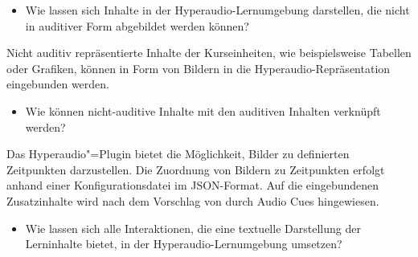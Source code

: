 \begin{itemize}
\item Wie lassen sich Inhalte in der Hyperaudio-Lernumgebung darstellen, die nicht in auditiver Form abgebildet werden können?
\end{itemize}

\hfill\begin{minipage}{\textwidth-1cm}
\vspace{0.1cm}
Nicht auditiv repräsentierte Inhalte der Kurseinheiten, wie beispielsweise Tabellen oder Grafiken, können in Form von Bildern in die Hyperaudio-Repräsentation eingebunden werden.
\vspace{0.25cm}
\end{minipage}

\begin{itemize}
\item Wie können nicht-auditive Inhalte mit den auditiven Inhalten verknüpft werden?
\end{itemize}

\hfill\begin{minipage}{\textwidth-1cm}
\vspace{0.1cm}
Das Hyperaudio"=Plugin bietet die Möglichkeit, Bilder zu definierten Zeitpunkten darzustellen. Die Zuordnung von Bildern zu Zeitpunkten erfolgt anhand einer Konfigurationsdatei im JSON-Format. Auf die eingebundenen Zusatzinhalte wird nach dem Vorschlag von \cite{donker2007gestaltung} durch Audio Cues hingewiesen.
\vspace{0.25cm}
\end{minipage}

\pagebreak

\begin{itemize}
\item Wie lassen sich alle Interaktionen, die eine textuelle Darstellung der Lerninhalte bietet, in der Hyperaudio-Lernumgebung umsetzen?
\end{itemize}

